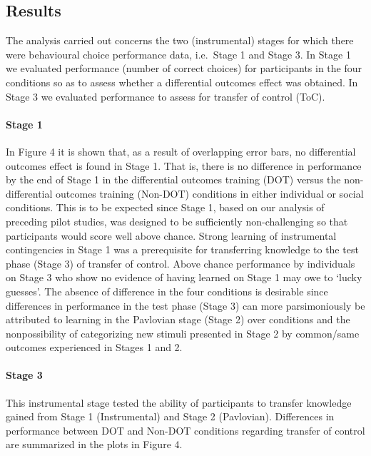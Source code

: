 \documentclass[]{elsarticle} %
\begin{document}
\hypertarget{results}{%
\subsection{Results}\label{results}}

The analysis carried out concerns the two (instrumental) stages for
which there were behavioural choice performance data, i.e.~Stage 1 and
Stage 3. In Stage 1 we evaluated performance (number of correct choices)
for participants in the four conditions so as to assess whether a
differential outcomes effect was obtained. In Stage 3 we evaluated
performance to assess for transfer of control (ToC).

\hypertarget{stage-1}{%
\paragraph{Stage 1}\label{stage-1}}

In Figure 4 it is shown that, as a result of overlapping error bars, no
differential outcomes effect is found in Stage 1. That is, there is no
difference in performance by the end of Stage 1 in the differential
outcomes training (DOT) versus the non-differential outcomes training
(Non-DOT) conditions in either individual or social conditions. This is
to be expected since Stage 1, based on our analysis of preceding pilot
studies, was designed to be sufficiently non-challenging so that
participants would score well above chance. Strong learning of
instrumental contingencies in Stage 1 was a prerequisite for
transferring knowledge to the test phase (Stage 3) of transfer of
control. Above chance performance by individuals on Stage 3 who show no
evidence of having learned on Stage 1 may owe to `lucky guesses'. The
absence of difference in the four conditions is desirable since
differences in performance in the test phase (Stage 3) can more
parsimoniously be attributed to learning in the Pavlovian stage (Stage
2) over conditions and the nonpossibility of categorizing new stimuli
presented in Stage 2 by common/same outcomes experienced in Stages 1 and
2.

\hypertarget{stage-3}{%
\paragraph{Stage 3}\label{stage-3}}

This instrumental stage tested the ability of participants to transfer
knowledge gained from Stage 1 (Instrumental) and Stage 2 (Pavlovian).
Differences in performance between DOT and Non-DOT conditions regarding
transfer of control are summarized in the plots in Figure 4.
\end{document}
